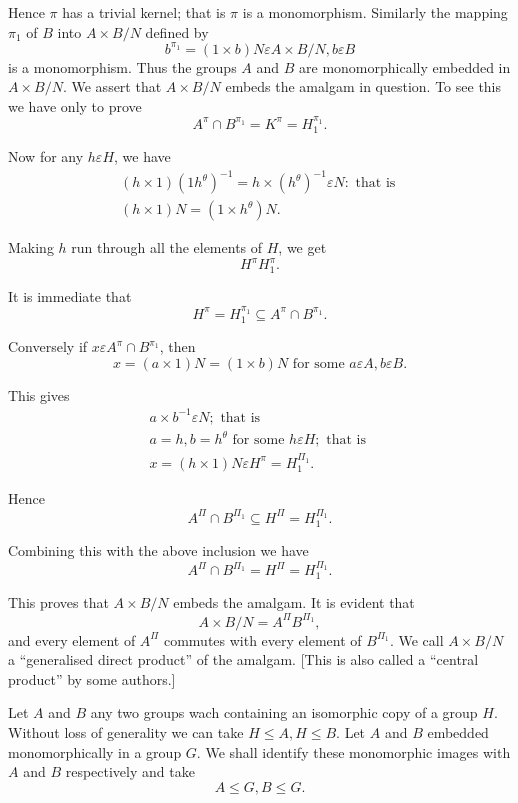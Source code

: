 Hence $\pi$ has a trivial kernel; that is $\pi$ is a
monomorphism. Similarly the mapping $\pi_1$ of $B$ into $A \times B
/N$ defined by  
$$
b^{\pi_1} = (1\times b)N \varepsilon A \times B /N, b \varepsilon B
$$
is a monomorphism. Thus the groups $A$ and $B$ are monomorphically
embedded in $A \times B/N$. We assert that $A \times B /N$ embeds the
amalgam in question. To see this we have only to prove  
$$
A^{\pi}\cap B^{\pi_1} = K^{\pi} = H_1^{\pi_1}.
$$

Now for any $h \varepsilon H$, we have 
\begin{gather*}
  (h \times 1)( 1 h^\theta )^{-1} = h \times ( h^\theta )^{-1}
  \varepsilon N : \text{ that is }\\ 
  (h \times 1) N = (1 \times h^\theta ) N. 
\end{gather*}

Making $h$ run through all the elements of $H$, we get 
$$
H^{\pi} H_1^{\pi}. 
$$

It is immediate that 
$$
H^\pi = H_1^{\pi_1} \subseteq A^\pi \cap B ^{\pi_1}.
$$

Conversely if $x \varepsilon A^\pi \cap B^{\pi _1}$, then 
$$
x = (a \times 1) N = (1 \times b) N  \text{ for some  } a  \varepsilon
A, b \varepsilon B.   
$$

This gives 
\begin{gather*}
  a \times b^{-1} \varepsilon N ; \text{ that is } \\
  a = h, b = h^\theta \text{ for some } h \varepsilon H ; \text{ that is }  \\
  x = (h \times 1)N \varepsilon H^{\pi} =  H_1 ^{\Pi_1}.
\end{gather*}

Hence 
$$
A^\Pi  \cap B^{\Pi_1} \subseteq H^{\Pi} = H^{\Pi_1}_1. 
$$

Combining this with the above inclusion we have 
$$
A^\Pi \cap B^{\Pi_1} = H^\Pi = H^{\Pi_1}_1. 
$$

This proves that $A \times B /N$ embeds the amalgam. It is evident that 
$$
A \times B /N = A^{\Pi} B^{\Pi_1}, 
$$
and every element of $A^{\Pi}$ commutes with every element of $B^{
  \Pi_1}$. We call $A \times B/N$ a ``generalised direct product'' of
the amalgam. [This is also called a ``central product'' by some
  authors.] 

Let $A$ and $B$ any two groups wach containing an isomorphic copy of a
group $H$. Without loss of generality we can take $H \leq A, H \leq
B$. Let $A$ and $B$ embedded monomorphically in a group $G$. We shall
identify these monomorphic images with $A$ and $B$ respectively and
take  
$$
A \leq G, B \leq G. 
$$

